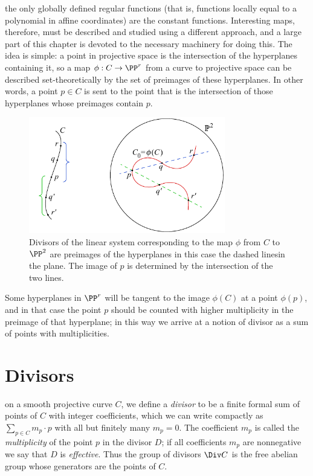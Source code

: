 the only globally defined regular functions (that is, functions locally 
%
equal to a polynomial in affine coordinates) are the constant functions. 
Interesting maps, therefore, must be described and studied using
a different approach, and a large part of this chapter is devoted to the necessary machinery for doing this. The idea is simple: a point in projective space is the intersection of the hyperplanes containing it, so a map $\phi: C\to \PP^r$ from a curve to projective space can be described set-theoretically
by the set of preimages of these hyperplanes. 
In other words, a point $p\in C$ is sent to the point
that is the intersection of those hyperplanes whose preimages contain $p$.
 
\begin{figure}[b]
\centerline {\includegraphics[height=2in]{"main/Fig01-1"}}
 \caption{Divisors of the linear system corresponding to the map
   $\phi$ from $C$ 
to $\PP^2$ are preimages of the hyperplanes\emdash
   in this case the dashed lines\emdash in the plane.
 The image of $p$ is determined by the intersection of the two lines.
}
\end{figure}


Some hyperplanes in $\PP^{r}$ will be tangent to the image $\phi(C)$ at a point $\phi(p)$, and in that case the point $p$ should be counted with higher multiplicity in the preimage of that hyperplane; in
this way we arrive at a notion of divisor as a sum of points with multiplicities.

\section{Divisors}

%
on a smooth projective curve $C$, we define a \emph{divisor} to be a
finite formal sum of points of $C$ with integer coefficients, which we
can write compactly as $\sum_{p\in C} m_p\cdot p$ with all but
finitely many $m_p=0$.  The coefficient $m_p$ is called the
\emph{multiplicity} of the point $p$ in the divisor $D$; if all
coefficients $m_p$ are nonnegative we say that $D$ is
\emph{effective}. Thus the group of divisors $\Div C$ is the free
abelian group whose generators
%
%
%
are the points of $C$.

